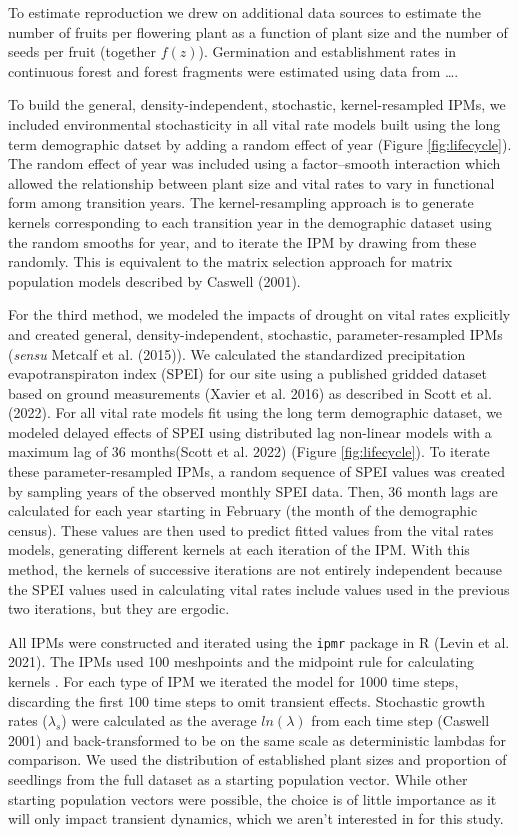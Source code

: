 \documentclass[
]{article}
\begin{document}
To estimate reproduction we drew on additional data sources to estimate the number of fruits per flowering plant as a function of plant size and the number of seeds per fruit (together \(f(z)\)).
Germination and establishment rates in continuous forest and forest fragments were estimated using data from \ldots.

To build the general, density-independent, stochastic, kernel-resampled IPMs, we included environmental stochasticity in all vital rate models built using the long term demographic datset by adding a random effect of year (Figure \ref{fig:lifecycle}).
The random effect of year was included using a factor--smooth interaction which allowed the relationship between plant size and vital rates to vary in functional form among transition years.
The kernel-resampling approach is to generate kernels corresponding to each transition year in the demographic dataset using the random smooths for year, and to iterate the IPM by drawing from these randomly.
This is equivalent to the matrix selection approach for matrix population models described by Caswell (2001).

For the third method, we modeled the impacts of drought on vital rates explicitly and created general, density-independent, stochastic, parameter-resampled IPMs (\emph{sensu} Metcalf et al. (2015)).
We calculated the standardized precipitation evapotranspiraton index (SPEI) for our site using a published gridded dataset based on ground measurements (Xavier et al. 2016) as described in Scott et al. (2022).
For all vital rate models fit using the long term demographic dataset, we modeled delayed effects of SPEI using distributed lag non-linear models with a maximum lag of 36 months(Scott et al. 2022) (Figure \ref{fig:lifecycle}).
To iterate these parameter-resampled IPMs, a random sequence of SPEI values was created by sampling years of the observed monthly SPEI data.
Then, 36 month lags are calculated for each year starting in February (the month of the demographic census).
These values are then used to predict fitted values from the vital rates models, generating different kernels at each iteration of the IPM.
With this method, the kernels of successive iterations are not entirely independent because the SPEI values used in calculating vital rates include values used in the previous two iterations, but they are ergodic.

All IPMs were constructed and iterated using the \texttt{ipmr} package in R (Levin et al. 2021).
The IPMs used 100 meshpoints and the midpoint rule for calculating kernels .
For each type of IPM we iterated the model for 1000 time steps, discarding the first 100 time steps to omit transient effects.
Stochastic growth rates (\(\lambda_s\)) were calculated as the average \(ln(\lambda)\) from each time step (Caswell 2001) and back-transformed to be on the same scale as deterministic lambdas for comparison.
We used the distribution of established plant sizes and proportion of seedlings from the full dataset as a starting population vector.
While other starting population vectors were possible, the choice is of little importance as it will only impact transient dynamics, which we aren't interested in for this study.
\end{document}
